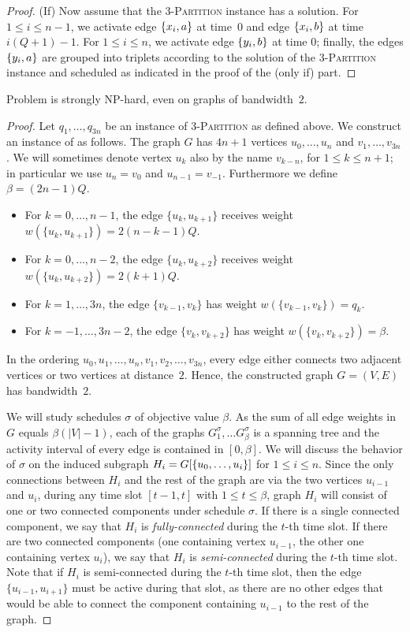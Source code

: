 \begin{proof}
(If) Now assume that the \textsc{3-Partition} instance has a solution. 
For $1\le i\le n-1$, we activate edge $\{ x_i,a \}$ at time~$0$ and edge $\{ x_i,b \}$ at time $i(Q+1)-1$.
For $1\le i\le n$, we activate edge $\{ y_i,b \}$ at time $0$; finally, the edges $\{ y_i,a \}$ are
grouped into triplets according to the solution of the \textsc{3-Partition} instance and scheduled
as indicated in the proof of the (only if) part.
\end{proof}

\begin{theorem}
\label{thm:hardness_bandwidth}
Problem {\xxxNTP} is strongly NP-hard, even on graphs of bandwidth~$2$.
\end{theorem}
\begin{proof}
Let $q_1,\ldots,q_{3n}$ be an instance of \textsc{3-Partition} as defined above.
We construct an instance of {\xxxNTP} as follows.
The graph $G$ has $4n+1$ vertices $u_0,\ldots,u_n$ and $v_1,\ldots,v_{3n}$.
We will sometimes denote vertex $u_k$ also by the name $v_{k-n}$, for $1\le k\le n+1$;
in particular we use $u_n=v_0$ and $u_{n-1}=v_{-1}$.
Furthermore we define $\beta=(2n-1)Q$.
\begin{itemize}
\item 
For $k=0,\ldots,n-1$,   the edge $\{u_k, u_{k+1}\}$ receives weight $w(\{u_k, u_{k+1}\}) = 2(n-k-1)Q$.
\item
For $k=0,\ldots,n-2$,   the edge $\{u_k, u_{k+2}\}$ receives weight $w(\{u_k, u_{k+2}\})=2(k+1)Q$.
\item 
For $k=1,\ldots,3n$,    the edge $\{v_{k-1}, v_k\}$ has weight $w(\{v_{k-1}, v_k\})=q_k$.
\item
For $k=-1,\ldots,3n-2$, the edge $\{v_k, v_{k+2}\}$ has weight $w(\{v_k, v_{k+2}\})=\beta$.  
\end{itemize}
In the ordering $u_0,u_1,\ldots,u_n,v_1,v_2,\ldots,v_{3n}$, every edge either connects two adjacent 
vertices or two vertices at distance~$2$. Hence, the constructed graph $G=(V,E)$ has bandwidth~$2$. 

We will study schedules $\sigma$ of objective value $\beta$. 
As the sum of all edge weights in $G$ equals $\beta(|V|-1)$, each of the graphs 
$G^\sigma_1, \dots G^\sigma_\beta$ is a spanning tree and the activity interval of every edge is contained in $[0, \beta]$.
We will discuss the behavior of $\sigma$ on the induced subgraph $H_i = G[\{ u_0, \ldots, u_i \}]$ for $1\le i\le n$.
Since the only connections between $H_i$ and the rest of the graph are via the two vertices $u_{i-1}$ and $u_i$,
during any time slot $[t-1,t]$ with $1\le t\le\beta$, graph $H_i$ will consist of one or two connected components
under schedule $\sigma$.
If there is a single connected component, we say that $H_i$ is \emph{fully-connected} during the $t$-th time slot.
If there are two connected components (one containing vertex $u_{i-1}$, the other one containing 
vertex $u_i$), we say that $H_i$ is \emph{semi-connected} during the $t$-th time slot.
Note that if $H_i$ is semi-connected during the $t$-th time slot, then the edge $\{u_{i-1}, u_{i+1}\}$ must be 
active during that slot, as there are no other edges that would be able to connect the component containing 
$u_{i-1}$ to the rest of the graph.


\end{proof}
